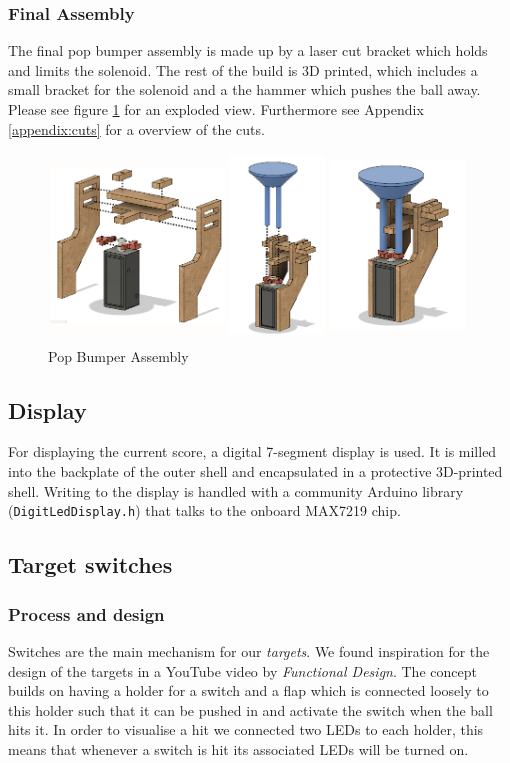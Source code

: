 \subsubsection{Final Assembly}
The final pop bumper assembly is made up by a laser cut bracket which holds and limits the solenoid. The rest of the build is 3D printed, which includes a small bracket for the solenoid and a the hammer which pushes the ball away. Please see figure \ref{fig:bumperassembly} for an exploded view. Furthermore see Appendix \ref{appendix:cuts} for a overview of the cuts.
\begin{figure}[h!]
	\centering
	\includegraphics[width=\textwidth]{img/BumperAssembly}
	\caption{Pop Bumper Assembly}
	\label{fig:bumperassembly}
\end{figure}

\subsection{Display}
For displaying the current score, a digital 7-segment display is used. 
It is milled into the backplate of the outer shell and encapsulated in a protective 3D-printed shell. 
Writing to the display is handled with a community Arduino library (\verb|DigitLedDisplay.h|) that talks to the  onboard MAX7219 chip. 

\subsection{Target switches}
\subsubsection{Process and design}
Switches are the main mechanism for our \textit{targets}. We found inspiration for the design of the targets in a YouTube video by \textit{Functional Design}\cite{functionaldesign_2017}. The concept builds on having a holder for a switch and a flap which is connected loosely to this holder such that it can be pushed in and activate the switch when the ball hits it. In order to visualise a hit we connected two LEDs to each holder, this means that whenever a switch is hit its associated LEDs will be turned on.

